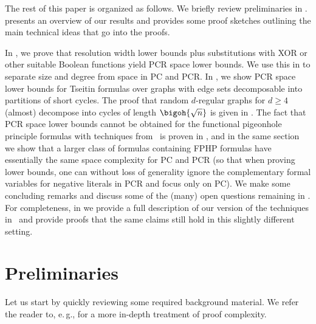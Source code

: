 \documentclass[11pt]{article}
\numberwithin{equation}{section}
\theoremstyle{definition}
\theoremstyle{plain}
\newcommand{\eg}{e.\,g.}
\begin{document}
%


  The rest of this paper is organized as follows.
  We briefly review preliminaries in
 .
   presents an overview of
  our results and provides some proof sketches outlining the main
  technical ideas that go into the proofs.
%

  In
 ,
  we prove that resolution width lower bounds plus substitutions with
  XOR or other suitable Boolean functions yield PCR space lower bounds.
  We use this in 
  to separate size and degree from space in PC and PCR.
  In
 ,
  we show PCR space lower bounds for Tseitin formulas over graphs
  with edge sets decomposable into partitions of %
  short  %
  cycles.
  The proof that random \mbox{$d$-regular} graphs for $d \geq 4$ (almost)
  decompose into cycles of length $\bigoh{\sqrt{n}}$ is given in
 .
  The fact that PCR space lower bounds cannot be obtained for the
  functional pigeonhole principle formulas with techniques from~\cite{BG15Framework} is
  proven in
 ,
  and in the same section 
  we show that a larger class of formulas containing FPHP formulas
  have essentially the same space complexity for PC and PCR
  (so that when proving lower bounds, one can without loss of
  generality ignore the complementary formal variables for negative literals
  in PCR and focus only on PC).
%
%
%
  We make some concluding remarks and discuss some of the
  (many) open questions remaining in 
 .  %
  For completeness, 
  in
  we provide a full description of our version of
  the techniques in~\cite{BG15Framework}
  and provide proofs that the same claims  still hold in this slightly
  different setting. 
 
%
\section{Preliminaries}
\label{sec:preliminaries}

Let us start by quickly reviewing some required background material. 
We refer the reader to, 
%
%
\eg,      %
\cite{BN21ProofCplxSAT,Krajicek19ProofComplexity}
for a more in-depth treatment of proof complexity.
\end{document}
